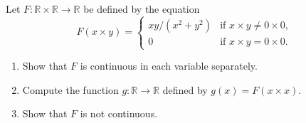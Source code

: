   \begin{exercise}[Munkres 18.12]
    Let $F : \mathbb{R} \times \mathbb{R} \to \mathbb{R}$ be defined by the equation
    \begin{equation}
      F(x \times y) = \begin{cases}
        xy/(x^2 + y^2) & \text{if } x \times y \neq 0 \times 0, \\
        0              & \text{if } x \times y = 0 \times 0.
      \end{cases}
    \end{equation}
    \begin{enumerate}
      \item Show that $F$ is continuous in each variable separately.
      \item Compute the function $g : \mathbb{R} \to \mathbb{R}$ defined by $g(x) = F(x \times x)$.
      \item Show that $F$ is not continuous.
    \end{enumerate}
  \end{exercise}
